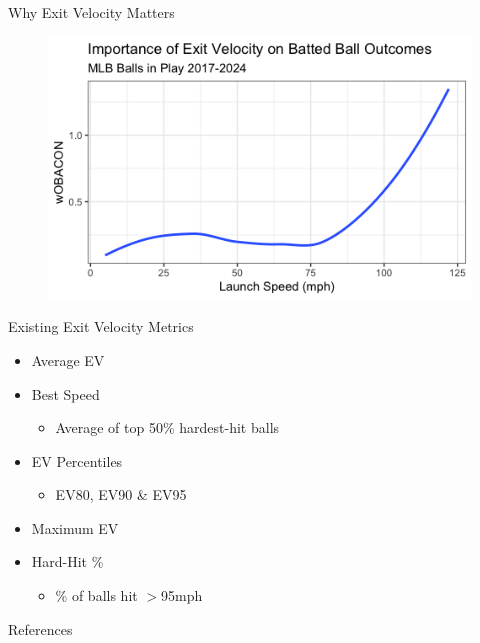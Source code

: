 \documentclass{beamer}
\begin{document}
\begin{frame}{Why Exit Velocity Matters}
    \begin{figure}
        \centering
        \includegraphics[width=\linewidth]{plots/ev_woba.png}
        \label{fig:ev_woba}
    \end{figure}
\end{frame}

\begin{frame}{Existing Exit Velocity Metrics}
\begin{itemize}
    \item Average EV
    \item Best Speed
    \begin{itemize}
        \item Average of top 50\% hardest-hit balls
    \end{itemize}
    \item EV Percentiles
    \begin{itemize}
        \item EV80, EV90 \& EV95
    \end{itemize}
    \item Maximum EV
    \item Hard-Hit \%
    \begin{itemize}
        \item \% of balls hit $>$95mph
    \end{itemize}
\end{itemize}
\end{frame}

\begin{frame}{References}
    \printbibliography
\end{frame}
\end{document}
